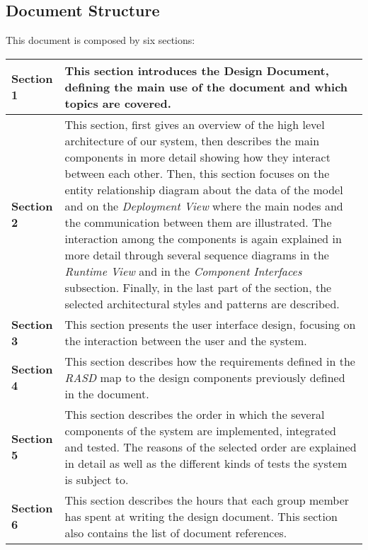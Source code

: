 \clearpage
\subsection{Document Structure}
This document is composed by six sections:

\begin{center}
\centering
\begin{table}[H]
\centering
\begin{tabular} { l p{10 cm} }
\toprule
\textbf{Section 1} & This section introduces the Design Document, defining the main use of the document and which topics are covered.                                                                                                                                  \\ \midrule
\textbf{Section 2} & This section, first gives an overview of the high level architecture of our system, then describes the main components in more detail showing how they interact between each other. Then, this section focuses on the entity relationship diagram about the data of the model and on the \textit{Deployment View} where the main nodes and the communication between them are illustrated. The interaction among the components is again explained in more detail through several sequence diagrams in the \textit{Runtime View} and in the \textit{Component Interfaces} subsection. Finally, in the last part of the section, the selected architectural styles and patterns are described. \\ \midrule
\textbf{Section 3} &  This section presents the user interface design, focusing on the interaction between the user and the system.  \\ \midrule
\textbf{Section 4}  & This section describes how the requirements defined in the \textit{RASD} map to the design components previously defined in the document.\\ \midrule
\textbf{Section 5} &  This section describes the order in which the several components of the system are implemented, integrated and tested. The reasons of the selected order are explained in detail as well as the different kinds of tests the system is subject to.
\\ \midrule
\textbf {Section 6} & This section describes the hours that each group member has spent at writing the design document.
This section also contains the list of document references. \\ \bottomrule
\end{tabular}
\end{table}
\clearpage
\end{center}
\clearpage
